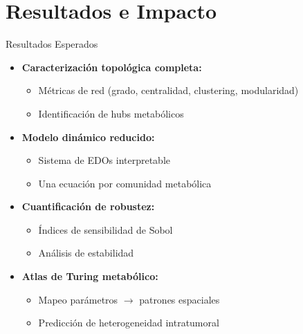 \documentclass[aspectratio=169, 11pt]{beamer}
\begin{document}
	\section{Resultados e Impacto}
	\begin{frame}{Resultados Esperados}
		\begin{itemize}
			\item \textbf{Caracterización topológica completa:}
			\begin{itemize}
				\item Métricas de red (grado, centralidad, clustering, modularidad)
				\item Identificación de hubs metabólicos
			\end{itemize}
			
			\vspace{0.2cm}
			\item \textbf{Modelo dinámico reducido:}
			\begin{itemize}
				\item Sistema de EDOs interpretable
				\item Una ecuación por comunidad metabólica
			\end{itemize}
			
			\vspace{0.2cm}
			\item \textbf{Cuantificación de robustez:}
			\begin{itemize}
				\item Índices de sensibilidad de Sobol
				\item Análisis de estabilidad
			\end{itemize}
			
			\vspace{0.2cm}
			\item \textbf{Atlas de Turing metabólico:}
			\begin{itemize}
				\item Mapeo parámetros $\rightarrow$ patrones espaciales
				\item Predicción de heterogeneidad intratumoral
			\end{itemize}
		\end{itemize}
	\end{frame}
	
\end{document}
